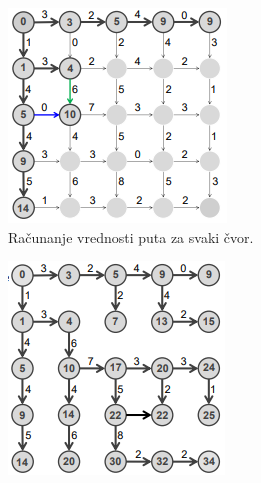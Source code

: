 \begin{minipage}{\textwidth}
	\centering
	\begin{minipage}{0.4\textwidth}
		
		\begin{figure}[H]
			\centering
			\includegraphics[width=\textwidth]{poglavlja/5/slike/putokazi1.png}
			\caption{Računanje vrednosti puta za svaki čvor.}
			\label{slika:putokazi1}
		\end{figure}  
	\end{minipage}
	\hfill 
	\begin{minipage}{0.4\textwidth}
		\begin{figure}[H]
			\centering
			\includegraphics[width=\textwidth]{poglavlja/5/slike/putokazi3.png}

\end{figure}
\end{minipage}
\end{minipage}
